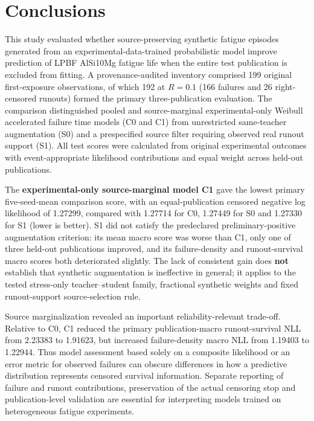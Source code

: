 \documentclass[12pt,a4paper]{article}
\begin{document}
\section{Conclusions}

This study evaluated whether source-preserving synthetic fatigue episodes generated from an experimental-data-trained probabilistic model improve prediction of LPBF AlSi10Mg fatigue life when the entire test publication is excluded from fitting. A provenance-audited inventory comprised 199 original first-exposure observations, of which 192 at \(R=0.1\) (166 failures and 26 right-censored runouts) formed the primary three-publication evaluation. The comparison distinguished pooled and source-marginal experimental-only Weibull accelerated failure time models (C0 and C1) from unrestricted same-teacher augmentation (S0) and a prespecified source filter requiring observed real runout support (S1). All test scores were calculated from original experimental outcomes with event-appropriate likelihood contributions and equal weight across held-out publications.

The \textbf{experimental-only source-marginal model C1} gave the lowest primary five-seed-mean comparison score, with an equal-publication censored negative log likelihood of 1.27299, compared with 1.27714 for C0, 1.27449 for S0 and 1.27330 for S1 (lower is better). S1 did not satisfy the predeclared preliminary-positive augmentation criterion: its mean macro score was worse than C1, only one of three held-out publications improved, and its failure-density and runout-survival macro scores both deteriorated slightly. The lack of consistent gain does \textbf{not} establish that synthetic augmentation is ineffective in general; it applies to the tested stress-only teacher–student family, fractional synthetic weights and fixed runout-support source-selection rule.

Source marginalization revealed an important reliability-relevant trade-off. Relative to C0, C1 reduced the primary publication-macro runout-survival NLL from 2.23383 to 1.91623, but increased failure-density macro NLL from 1.19403 to 1.22944. Thus model assessment based solely on a composite likelihood or an error metric for observed failures can obscure differences in how a predictive distribution represents censored survival information. Separate reporting of failure and runout contributions, preservation of the actual censoring stop and publication-level validation are essential for interpreting models trained on heterogeneous fatigue experiments.
\end{document}

